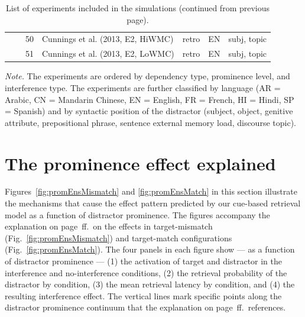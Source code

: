 \documentclass{cambridge7A}\usepackage[]{graphicx}\usepackage[]{color}
\begin{document}
\begin{subappendices}
\begin{table}[!htbp]
{\begin{tabular}{llrllll}
               &            & 50    & Cunnings et al. (2013, E2, HiWMC)   & retro   & EN   & subj, topic \\
               &            & 51    & Cunnings et al. (2013, E2, LoWMC)   & retro   & EN   & subj, topic \\
\end{tabular}
\begin{tablenotes}
\item \emph{Note.} The experiments are ordered by dependency type, prominence level, and interference type. 
The experiments are further classified by language (AR = Arabic, CN = Mandarin Chinese, EN = English, FR = French, HI = Hindi, SP = Spanish) and by syntactic position of the distractor (subject, object, genitive attribute, prepositional phrase, sentence external memory load, discourse topic). 
\end{tablenotes}
}
\caption{List of experiments included in the simulations (continued from previous page).}\label{tab:exps2}
\end{table}

\clearpage
\section{The prominence effect explained}
\label{sec:appendixProm}
Figures~\ref{fig:promEnsMismatch} and \ref{fig:promEnsMatch} in this section illustrate the mechanisms that cause the effect pattern predicted by our cue-based retrieval model as a function of distractor prominence. The figures accompany the explanation on page~\pageref{promexpl}ff.\ on the effects in target-mismatch (Fig.~\ref{fig:promEnsMismatch}) and target-match configurations (Fig.~\ref{fig:promEnsMatch}).
The four panels in each figure show --- as a function of distractor prominence --- (1) the activation of target and distractor in the interference and no-interference conditions, (2) the retrieval probability of the distractor by condition, (3) the mean retrieval latency by condition, and (4) the resulting interference effect. The vertical lines mark specific points along the distractor prominence continuum that the explanation on page~\pageref{promexpl}ff.\ references.



\end{subappendices}
\end{document}
